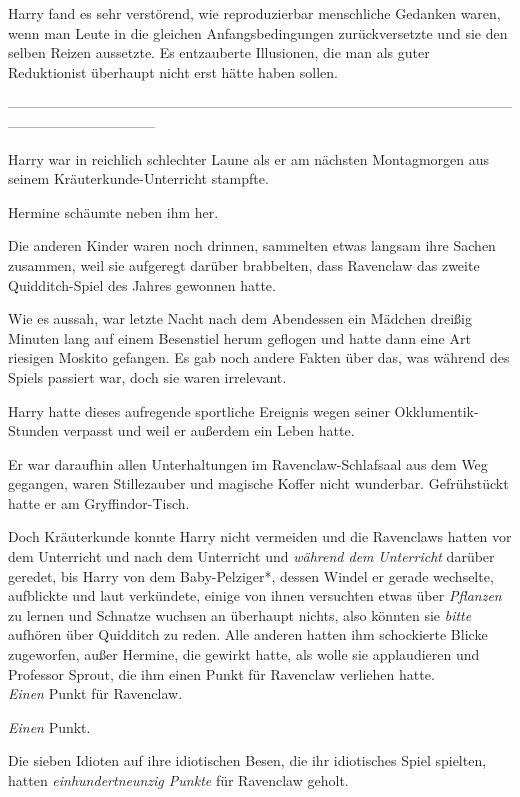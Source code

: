 {Harry fand es sehr verstörend, wie reproduzierbar menschliche Gedanken waren, wenn man Leute in die gleichen Anfangsbedingungen zurückversetzte und sie den selben Reizen aussetzte. Es entzauberte Illusionen, die man als guter Reduktionist überhaupt nicht erst hätte haben sollen.

--------------------------------------------------------------------------------------------------------------------------------------------

Harry war in reichlich schlechter Laune als er am nächsten Montagmorgen aus seinem Kräuterkunde-Unterricht stampfte.

Hermine schäumte neben ihm her.

Die anderen Kinder waren noch drinnen, sammelten etwas langsam ihre Sachen zusammen, weil sie aufgeregt darüber brabbelten, dass Ravenclaw das zweite Quidditch-Spiel des Jahres gewonnen hatte.

Wie es aussah, war letzte Nacht nach dem Abendessen ein Mädchen dreißig Minuten lang auf einem Besenstiel herum geflogen und hatte dann eine Art riesigen Moskito gefangen. Es gab noch andere Fakten über das, was während des Spiels passiert war, doch sie waren irrelevant.

Harry hatte dieses aufregende sportliche Ereignis wegen seiner Okklumentik-Stunden verpasst und weil er außerdem ein Leben hatte.

Er war daraufhin allen Unterhaltungen im Ravenclaw-Schlafsaal aus dem Weg gegangen, waren Stillezauber und magische Koffer nicht wunderbar. Gefrühstückt hatte er am Gryffindor-Tisch.

Doch Kräuterkunde konnte Harry nicht vermeiden und die Ravenclaws hatten vor dem Unterricht und nach dem Unterricht und \emph{während dem} \emph{Unterricht} darüber geredet, bis Harry von dem Baby-Pelziger*, dessen Windel er gerade wechselte, aufblickte und laut verkündete, einige von ihnen versuchten etwas über \emph{Pflanzen} zu lernen und Schnatze wuchsen an überhaupt nichts, also könnten sie \emph{bitte} aufhören über Quidditch zu reden. Alle anderen hatten ihm schockierte Blicke zugeworfen, außer Hermine, die gewirkt hatte, als wolle sie applaudieren und Professor Sprout, die ihm einen Punkt für Ravenclaw verliehen hatte.\\ \emph{Einen} Punkt für Ravenclaw.

\emph{Einen} Punkt.

Die sieben Idioten auf ihre idiotischen Besen, die ihr idiotisches Spiel spielten, hatten \emph{einhundertneunzig Punkte} für Ravenclaw geholt.

}
